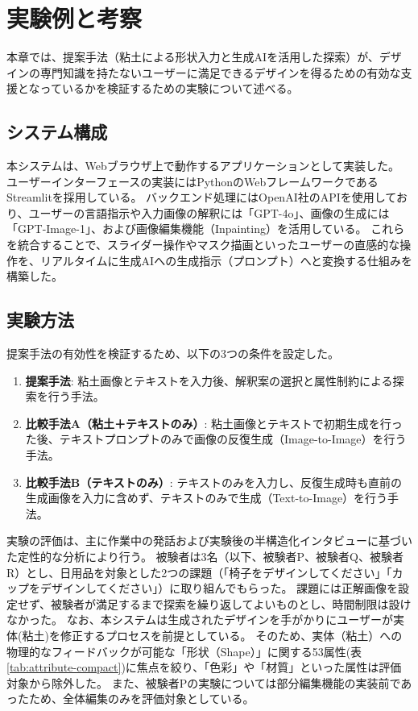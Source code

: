 \documentclass{kuisthesis}
\begin{document}
\section{実験例と考察} 
本章では、提案手法（粘土による形状入力と生成AIを活用した探索）が、デザインの専門知識を持たないユーザーに満足できるデザインを得るための有効な支援となっているかを検証するための実験について述べる。

\subsection{システム構成} 
本システムは、Webブラウザ上で動作するアプリケーションとして実装した。 
ユーザーインターフェースの実装にはPythonのWebフレームワークであるStreamlitを採用している。 
バックエンド処理にはOpenAI社のAPIを使用しており、ユーザーの言語指示や入力画像の解釈には「GPT-4o」、画像の生成には「GPT-Image-1」、および画像編集機能（Inpainting）を活用している。 
これらを統合することで、スライダー操作やマスク描画といったユーザーの直感的な操作を、リアルタイムに生成AIへの生成指示（プロンプト）へと変換する仕組みを構築した。


\subsection{実験方法} 
提案手法の有効性を検証するため、以下の3つの条件を設定した。

\begin{enumerate} 
  \item \textbf{提案手法}: 粘土画像とテキストを入力後、解釈案の選択と属性制約による探索を行う手法。 
  \item \textbf{比較手法A（粘土＋テキストのみ）}: 粘土画像とテキストで初期生成を行った後、テキストプロンプトのみで画像の反復生成（Image-to-Image）を行う手法。 
  \item \textbf{比較手法B（テキストのみ）}: テキストのみを入力し、反復生成時も直前の生成画像を入力に含めず、テキストのみで生成（Text-to-Image）を行う手法。 
\end{enumerate}

実験の評価は、主に作業中の発話および実験後の半構造化インタビューに基づいた定性的な分析により行う。 
被験者は3名（以下、被験者P、被験者Q、被験者R）とし、日用品を対象とした2つの課題（「椅子をデザインしてください」「カップをデザインしてください」）に取り組んでもらった。 
課題には正解画像を設定せず、被験者が満足するまで探索を繰り返してよいものとし、時間制限は設けなかった。 
なお、本システムは生成されたデザインを手がかりにユーザーが実体(粘土)を修正するプロセスを前提としている。 
そのため、実体（粘土）への物理的なフィードバックが可能な「形状（Shape）」に関する53属性(表\ref{tab:attribute-compact})に焦点を絞り、「色彩」や「材質」といった属性は評価対象から除外した。 
また、被験者Pの実験については部分編集機能の実装前であったため、全体編集のみを評価対象としている。
\end{document}
